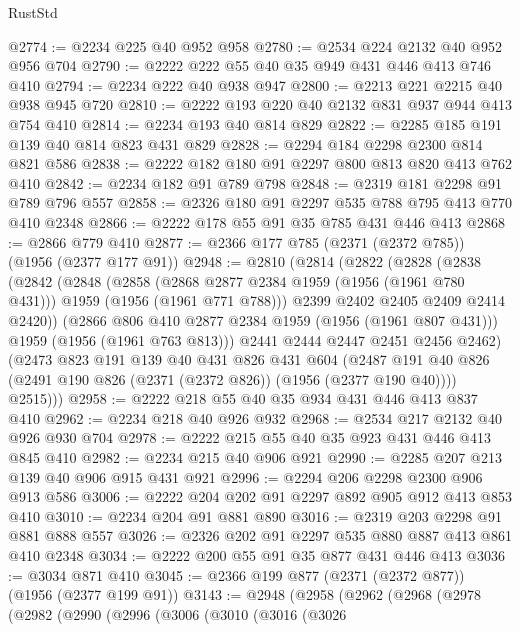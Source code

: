 \begin{lexlean}{RustStd}
\begin{coremodule}
@2774 := @2234 @225 @40 @952 @958
@2780 := @2534 @224 @2132 @40 @952 @956 @704
@2790 := @2222 @222 @55 @40 @35 @949 @431 @446 @413 @746 @410
@2794 := @2234 @222 @40 @938 @947
@2800 := @2213 @221 @2215 @40 @938 @945 @720
@2810 := @2222 @193 @220 @40 @2132 @831 @937 @944 @413 @754 @410
@2814 := @2234 @193 @40 @814 @829
@2822 := @2285 @185 @191 @139 @40 @814 @823 @431 @829
@2828 := @2294 @184 @2298 @2300 @814 @821 @586
@2838 := @2222 @182 @180 @91 @2297 @800 @813 @820 @413 @762 @410
@2842 := @2234 @182 @91 @789 @798
@2848 := @2319 @181 @2298 @91 @789 @796 @557
@2858 := @2326 @180 @91 @2297 @535 @788 @795 @413 @770 @410 @2348
@2866 := @2222 @178 @55 @91 @35 @785 @431 @446 @413
@2868 := @2866 @779 @410
@2877 := @2366 @177 @785 (@2371 (@2372 @785)) (@1956 (@2377 @177 @91))
@2948 := @2810
    (@2814
      (@2822
        (@2828
          (@2838
            (@2842
              (@2848
                (@2858
                  (@2868 @2877 @2384 @1959 (@1956 (@1961 @780 @431)))
                  @1959
                  (@1956 (@1961 @771 @788)))
                @2399
                @2402
                @2405
                @2409
                @2414
                @2420))
            (@2866 @806 @410 @2877 @2384 @1959 (@1956 (@1961 @807 @431)))
            @1959
            (@1956 (@1961 @763 @813)))
          @2441
          @2444
          @2447
          @2451
          @2456
          @2462)
        (@2473
          @823
          @191
          @139
          @40
          @431
          @826
          @431
          @604
          (@2487 @191 @40 @826 (@2491 @190 @826 (@2371 (@2372 @826)) (@1956 (@2377 @190 @40))))
          @2515)))
@2958 := @2222 @218 @55 @40 @35 @934 @431 @446 @413 @837 @410
@2962 := @2234 @218 @40 @926 @932
@2968 := @2534 @217 @2132 @40 @926 @930 @704
@2978 := @2222 @215 @55 @40 @35 @923 @431 @446 @413 @845 @410
@2982 := @2234 @215 @40 @906 @921
@2990 := @2285 @207 @213 @139 @40 @906 @915 @431 @921
@2996 := @2294 @206 @2298 @2300 @906 @913 @586
@3006 := @2222 @204 @202 @91 @2297 @892 @905 @912 @413 @853 @410
@3010 := @2234 @204 @91 @881 @890
@3016 := @2319 @203 @2298 @91 @881 @888 @557
@3026 := @2326 @202 @91 @2297 @535 @880 @887 @413 @861 @410 @2348
@3034 := @2222 @200 @55 @91 @35 @877 @431 @446 @413
@3036 := @3034 @871 @410
@3045 := @2366 @199 @877 (@2371 (@2372 @877)) (@1956 (@2377 @199 @91))
@3143 := @2948
    (@2958
      (@2962
        (@2968
          (@2978
            (@2982
              (@2990
                (@2996
                  (@3006
                    (@3010
                      (@3016
                        (@3026

\end{coremodule}
\end{lexlean}

